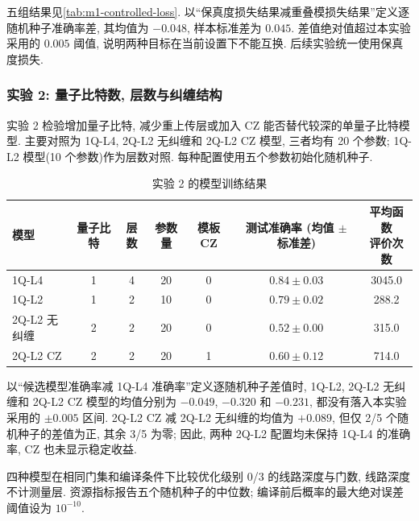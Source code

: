 \documentclass[a4paper]{ctexart}
\begin{document}
五组结果见\cref{tab:m1-controlled-loss}. 以``保真度损失结果减重叠模损失结果''定义逐随机种子准确率差, 其均值为 $-0.048$, 样本标准差为 $0.045$. 差值绝对值超过本实验采用的 $0.005$ 阈值, 说明两种目标在当前设置下不能互换. 后续实验统一使用保真度损失.

\subsubsection{实验 2: 量子比特数, 层数与纠缠结构}
\label{subsec:m2-resource}

实验 2 检验增加量子比特, 减少重上传层或加入 CZ 能否替代较深的单量子比特模型. 主要对照为 1Q-L4, 2Q-L2 无纠缠和 2Q-L2 CZ 模型, 三者均有 20 个参数; 1Q-L2 模型(10 个参数)作为层数对照. 每种配置使用五个参数初始化随机种子.

\begin{table}[H]
    \centering
    \caption{实验 2 的模型训练结果}
    \small
    \setlength{\tabcolsep}{3pt}
    \renewcommand{\arraystretch}{1.2}
    \begin{tabular*}{\textwidth}{@{\extracolsep{\fill}}lcccccc@{}}
        \toprule
        模型 & 量子比特 & 层数 & 参数量 & 模板 CZ &
        \shortstack{测试准确率\\(均值 $\pm$ 标准差)} & \shortstack{平均函数\\评价次数} \\
        \midrule
        1Q-L4 & 1 & 4 & 20 & 0 & $0.84\pm0.03$ & 3045.0 \\
        1Q-L2 & 1 & 2 & 10 & 0 & $0.79\pm0.02$ & 288.2 \\
        2Q-L2 无纠缠 & 2 & 2 & 20 & 0 & $0.52\pm0.00$ & 315.0 \\
        2Q-L2 CZ & 2 & 2 & 20 & 1 & $0.60\pm0.12$ & 714.0 \\
        \bottomrule
    \end{tabular*}
\end{table}

以``候选模型准确率减 1Q-L4 准确率''定义逐随机种子差值时, 1Q-L2, 2Q-L2 无纠缠和 2Q-L2 CZ 模型的均值分别为 $-0.049$, $-0.320$ 和 $-0.231$, 都没有落入本实验采用的 $\pm0.005$ 区间. 2Q-L2 CZ 减 2Q-L2 无纠缠的均值为 $+0.089$, 但仅 2/5 个随机种子的差值为正, 其余 3/5 为零; 因此, 两种 2Q-L2 配置均未保持 1Q-L4 的准确率, CZ 也未显示稳定收益.

四种模型在相同门集和编译条件下比较优化级别 0/3 的线路深度与门数, 线路深度不计测量层. 资源指标报告五个随机种子的中位数; 编译前后概率的最大绝对误差阈值设为 $10^{-10}$.
\end{document}
